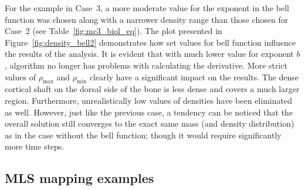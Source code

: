 \documentclass[11pt]{acmeArticle}
\numberwithin{equation}{section}
\begin{document}
For the example in Case~3, a more moderate value for the exponent in the bell function was chosen along with a narrower density range than those chosen for Case~2 (see Table~\ref{fig:mc3_biol_eq}).
The plot presented in Figure~\ref{fig:density_bell2} demonstrates how set values for bell function influence the results of the analysis. 
It is evident that with much lower value for exponent $b$, algorithm no longer has problems with calculating the derivative. 
More strict values of $\rho_\mathrm{max}$ and $\rho_\mathrm{min}$ clearly have a significant impact on the results. 
The dense cortical shaft on the dorsal side of the bone is less dense and covers a much larger region. 
Furthermore, unrealistically low values of densities have been eliminated as well. 
However, just like the previous case, a tendency can be noticed that the overall solution still converges to the exact same mass (and density distribution) as in the case without the bell function; though it would require significantly more time steps. \\
\subsection{MLS mapping examples}
\label{sec:mals_mapping}
\end{document}
